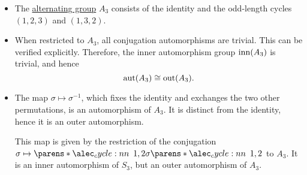 \begin{example}
\begin{itemize}
    \item The \hyperref[def:alternating_group]{alternating group} \( A_3 \) consists of the identity and the odd-length cycles \( (1, 2, 3) \) and \( (1, 3, 2) \).

    \item When restricted to \( A_3 \), all conjugation automorphisms are trivial. This can be verified explicitly. Therefore, the inner automorphism group \( \operatorname{inn}(A_3) \) is trivial, and hence
    \begin{equation*}
      \operatorname{aut}(A_3) \cong \operatorname{out}(A_3).
    \end{equation*}

    \item The map \( \sigma \mapsto \sigma^{-1} \), which fixes the identity and exchanges the two other permutations, is an automorphism of \( A_3 \). It is distinct from the identity, hence it is an outer automorphism.

    This map is given by the restriction of the conjugation \( \sigma \mapsto \cycle{1, 2} \sigma \cycle{1, 2} \) to \( A_3 \). It is an inner automorphism of \( S_3 \), but an outer automorphism of \( A_3 \).
  \end{itemize}
\end{example}

